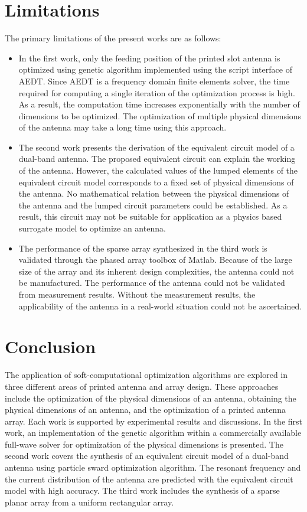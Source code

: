 \section{Limitations}
The primary limitations of the present works are as follows:
\begin{itemize}
\item In the first work, only the feeding position of the printed slot antenna is optimized using genetic algorithm implemented using the script interface of AEDT. Since AEDT is a frequency domain finite elements solver, the time required for computing a single iteration of the optimization process is high. As a result, the computation time increases exponentially with the number of dimensions to be optimized. The optimization of multiple physical dimensions of the antenna may take a long time using this approach.
\item The second work presents the derivation of the equivalent circuit model of a dual-band antenna. The proposed equivalent circuit can explain the working of the antenna. However, the calculated values of the lumped elements of the equivalent circuit model corresponds to a fixed set of physical dimensions of the antenna. No mathematical relation between the physical dimensions of the antenna and the lumped circuit parameters could be established. As a result, this circuit may not be suitable for application as a physics based surrogate model to optimize an antenna.
\item The performance of the sparse array synthesized in the third work is validated through the phased array toolbox of Matlab. Because of the large size of the array and its inherent design complexities, the antenna could not be manufactured. The performance of the antenna could not be validated from measurement results. Without the measurement results, the applicability of the antenna in a real-world situation could not be ascertained.
\end{itemize}

\section{Conclusion}
The application of soft-computational optimization algorithms are explored in three different areas of printed antenna and array design. These approaches include the optimization of the physical dimensions of an antenna, obtaining the physical dimensions of an antenna, and the optimization of a printed antenna array. Each work is supported by experimental results and discussions. In the first work, an implementation of the genetic algorithm within a commercially available full-wave solver for optimization of the physical dimensions is presented. The second work covers the synthesis of an equivalent circuit model of a dual-band antenna using particle sward optimization algorithm. The resonant frequency and the current distribution of the antenna are predicted with the equivalent circuit model with high accuracy. The third work includes the synthesis of a sparse planar array from a uniform rectangular array.

